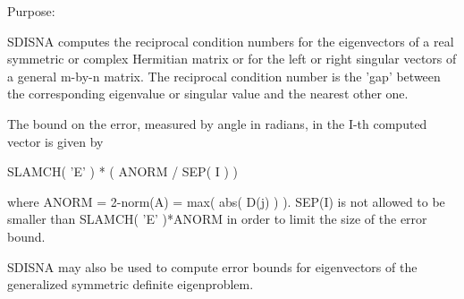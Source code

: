  \begin{DoxyParagraph}{Purpose\+: }
\begin{DoxyVerb} SDISNA computes the reciprocal condition numbers for the eigenvectors
 of a real symmetric or complex Hermitian matrix or for the left or
 right singular vectors of a general m-by-n matrix. The reciprocal
 condition number is the 'gap' between the corresponding eigenvalue or
 singular value and the nearest other one.

 The bound on the error, measured by angle in radians, in the I-th
 computed vector is given by

        SLAMCH( 'E' ) * ( ANORM / SEP( I ) )

 where ANORM = 2-norm(A) = max( abs( D(j) ) ).  SEP(I) is not allowed
 to be smaller than SLAMCH( 'E' )*ANORM in order to limit the size of
 the error bound.

 SDISNA may also be used to compute error bounds for eigenvectors of
 the generalized symmetric definite eigenproblem.\end{DoxyVerb}
 
\end{DoxyParagraph}

